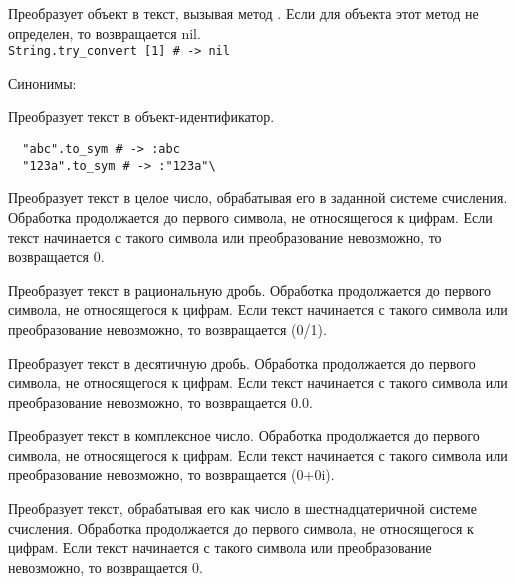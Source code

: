 \begin{methodlist}
  Преобразует объект в текст, вызывая метод . Если для объекта этот метод не определен, то возвращается nil.
  \\\verb!String.try_convert [1] # -> nil!

  Синонимы: 

  Преобразует текст в объект-идентификатор.
  \begin{verbatim}
  "abc".to_sym # -> :abc
  "123a".to_sym # -> :"123a"\
  \end{verbatim}  

  Преобразует текст в целое число, обрабатывая его в заданной системе счисления. Обработка продолжается до первого символа, не относящегося к цифрам. Если текст начинается с такого символа или преобразование невозможно, то возвращается 0.

  Преобразует текст в рациональную дробь. Обработка продолжается до первого символа, не относящегося к цифрам. Если текст начинается с такого символа или преобразование невозможно, то возвращается (0/1). 

  Преобразует текст в десятичную дробь. Обработка продолжается до первого символа, не относящегося к цифрам. Если текст начинается с такого символа или преобразование невозможно, то возвращается 0.0. 

  Преобразует текст в комплексное число. Обработка продолжается до первого символа, не относящегося к цифрам. Если текст начинается с такого символа или преобразование невозможно, то возвращается (0+0i).

  Преобразует текст, обрабатывая его как число в шестнадцатеричной системе счисления. Обработка продолжается до первого символа, не относящегося к цифрам. Если текст начинается с такого символа или преобразование невозможно, то возвращается 0.


\end{methodlist}
